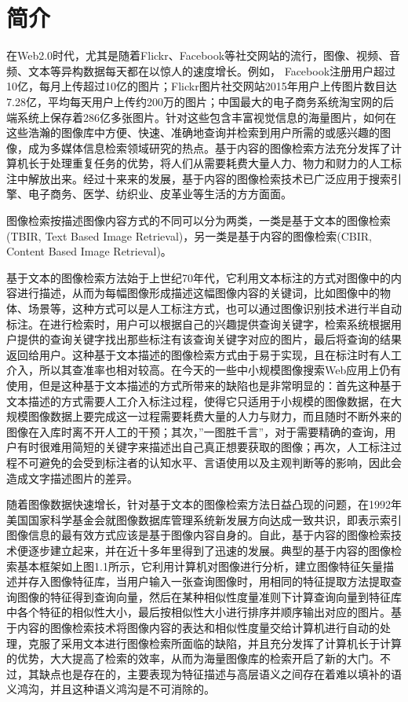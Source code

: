 \documentclass[color=cyan,mathpazo,titlestyle=hang]{elegantbook}
\author{袁勇}
\begin{document}
\maketitle
\tableofcontents
\mainmatter

\chapter{简介}

在Web2.0时代，尤其是随着Flickr、Facebook等社交网站的流行，图像、视频、音频、文本等异构数据每天都在以惊人的速度增长。例如， Facebook注册用户超过10亿，每月上传超过10亿的图片；Flickr图片社交网站2015年用户上传图片数目达7.28亿，平均每天用户上传约200万的图片；中国最大的电子商务系统淘宝网的后端系统上保存着286亿多张图片。针对这些包含丰富视觉信息的海量图片，如何在这些浩瀚的图像库中方便、快速、准确地查询并检索到用户所需的或感兴趣的图像，成为多媒体信息检索领域研究的热点。基于内容的图像检索方法充分发挥了计算机长于处理重复任务的优势，将人们从需要耗费大量人力、物力和财力的人工标注中解放出来。经过十来来的发展，基于内容的图像检索技术已广泛应用于搜索引擎、电子商务、医学、纺织业、皮革业等生活的方方面面。

图像检索按描述图像内容方式的不同可以分为两类，一类是基于文本的图像检索(TBIR, Text Based Image Retrieval)，另一类是基于内容的图像检索(CBIR, Content Based Image Retrieval)。

基于文本的图像检索方法始于上世纪70年代，它利用文本标注的方式对图像中的内容进行描述，从而为每幅图像形成描述这幅图像内容的关键词，比如图像中的物体、场景等，这种方式可以是人工标注方式，也可以通过图像识别技术进行半自动标注。在进行检索时，用户可以根据自己的兴趣提供查询关键字，检索系统根据用户提供的查询关键字找出那些标注有该查询关键字对应的图片，最后将查询的结果返回给用户。这种基于文本描述的图像检索方式由于易于实现，且在标注时有人工介入，所以其查准率也相对较高。在今天的一些中小规模图像搜索Web应用上仍有使用，但是这种基于文本描述的方式所带来的缺陷也是非常明显的：首先这种基于文本描述的方式需要人工介入标注过程，使得它只适用于小规模的图像数据，在大规模图像数据上要完成这一过程需要耗费大量的人力与财力，而且随时不断外来的图像在入库时离不开人工的干预；其次，”一图胜千言”，对于需要精确的查询，用户有时很难用简短的关键字来描述出自己真正想要获取的图像；再次，人工标注过程不可避免的会受到标注者的认知水平、言语使用以及主观判断等的影响，因此会造成文字描述图片的差异。

随着图像数据快速增长，针对基于文本的图像检索方法日益凸现的问题，在1992年美国国家科学基金会就图像数据库管理系统新发展方向达成一致共识，即表示索引图像信息的最有效方式应该是基于图像内容自身的。自此，基于内容的图像检索技术便逐步建立起来，并在近十多年里得到了迅速的发展。典型的基于内容的图像检索基本框架如上图1.1所示，它利用计算机对图像进行分析，建立图像特征矢量描述并存入图像特征库，当用户输入一张查询图像时，用相同的特征提取方法提取查询图像的特征得到查询向量，然后在某种相似性度量准则下计算查询向量到特征库中各个特征的相似性大小，最后按相似性大小进行排序并顺序输出对应的图片。基于内容的图像检索技术将图像内容的表达和相似性度量交给计算机进行自动的处理，克服了采用文本进行图像检索所面临的缺陷，并且充分发挥了计算机长于计算的优势，大大提高了检索的效率，从而为海量图像库的检索开启了新的大门。不过，其缺点也是存在的，主要表现为特征描述与高层语义之间存在着难以填补的语义鸿沟，并且这种语义鸿沟是不可消除的。
\end{document}
